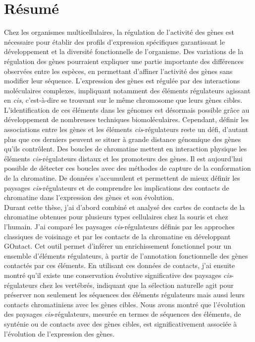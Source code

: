 \chapter*{Résumé}
\label{résumé}

Chez les organismes multicellulaires, la régulation de l'activité des gènes est nécessaire pour établir des profils d’expression spécifiques garantissant le développement et la diversité fonctionnelle de l’organisme. Des variations de la régulation des gènes pourraient expliquer une partie importante des différences observées entre les espèces, en permettant d’affiner l’activité des gènes sans modifier leur séquence. L’expression des gènes est régulée par des interactions moléculaires complexes, impliquant notamment des éléments régulateurs agissant en \textit{cis}, c’est-à-dire se trouvant sur le même chromosome que leurs gènes cibles. L’identification de ces éléments dans les génomes est désormais possible grâce au développement de nombreuses techniques biomoléculaires. Cependant, définir les associations entre les gènes et les éléments \textit{cis}-régulateurs reste un défi, d’autant plus que ces derniers peuvent se situer à grande distance génomique des gènes qu’ils contrôlent. Des boucles de chromatine mettent en interaction physique les éléments \textit{cis}-régulateurs distaux et les promoteurs des gènes. Il est aujourd’hui possible de détecter ces boucles avec des méthodes de capture de la conformation de la chromatine. De données s’accumulent et permettent de mieux définir les paysages \textit{cis}-régulateurs et de comprendre les implications des contacts de chromatine dans l’expression des gènes et son évolution.\\

Durant cette thèse, j’ai d’abord combiné et analysé des cartes de contacts de la chromatine obtenues pour plusieurs types cellulaires chez la souris et chez l’humain. J’ai comparé les paysages \textit{cis}-régulateurs définis par les approches classiques de voisinage et par les contacts de la chromatine en développant GOntact. Cet outil permet d’inférer un enrichissement fonctionnel pour un ensemble d’éléments régulateurs, à partir de l'annotation fonctionnelle des gènes contactés par ces éléments. En utilisant ces données de contacts, j’ai ensuite montré qu'il existe une conservation évolutive significative des paysages \textit{cis}-régulateurs chez les vertébrés, indiquant que la sélection naturelle agit pour préserver non seulement les séquences des éléments régulateurs mais aussi leurs contacts chromatiniens avec les gènes cibles. Nous avons montré que l'évolution des paysages \textit{cis}-régulateurs, mesurée en termes de séquences des éléments, de synténie ou de contacts avec des gènes cibles, est significativement associée à l'évolution de l'expression des gènes. \\

